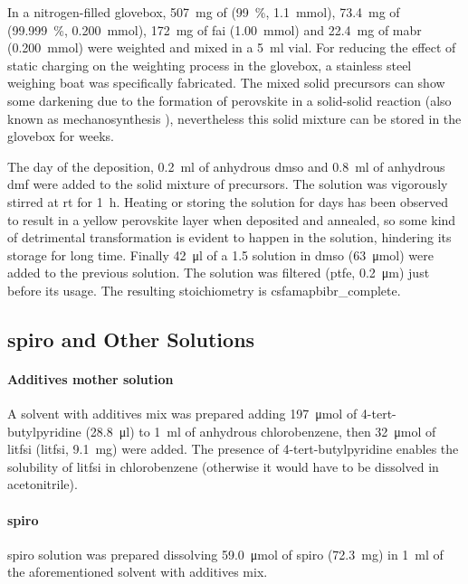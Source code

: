 		In a nitrogen-filled glovebox, \SI{507}{\mg} of  (\SI{99}{\%}, \SI{1.1}{\mmol}), \SI{73.4}{\mg} of  (\SI{99.999}{\%}, \SI{0.200}{\mmol}), \SI{172}{\mg} of \gls{fai} (\SI{1.00}{\mmol}) and \SI{22.4}{\mg} of \gls{mabr} (\SI{0.200}{\mmol}) were weighted and mixed in a \SI{5}{\ml} vial.
		For reducing the effect of static charging on the weighting process in the glovebox, a stainless steel weighing boat was specifically fabricated.
		The mixed solid precursors can show some darkening due to the formation of perovskite in a solid-solid reaction (also known as mechanosynthesis \cite{Prochowicz2018}), nevertheless this solid mixture can be stored in the glovebox for weeks.

		The day of the deposition, \SI{0.2}{\ml} of anhydrous \gls{dmso} and \SI{0.8}{\ml} of anhydrous \gls{dmf} were added to the solid mixture of precursors.
		The solution was vigorously stirred at \gls{rt} for \SI{1}{\hour}.
		Heating or storing the solution for days has been observed to result in a yellow perovskite layer when deposited and annealed, so some kind of detrimental transformation is evident to happen in the solution, hindering its storage for long time.
		Finally \SI{42}{\ul} of	a \SI{1.5}{\Molar}  solution in \gls{dmso} (\SI{63}{\umol}) were added to the previous solution.
		The solution was filtered (\gls{ptfe}, \SI{0.2}{\um}) just before its usage.
		The resulting stoichiometry is \acrshort{csfamapbibr_complete}.

	\subsection{\Gls{spiro} and Other  Solutions}

		\paragraph{Additives mother solution}
		A solvent with additives mix was prepared adding \SI{197}{\umol} of 4-tert-butylpyridine (\SI{28.8}{\ul}) to \SI{1}{\ml} of anhydrous chlorobenzene, then \SI{32}{\umol} of \glsdesc{litfsi} (\gls{litfsi}, \SI{9.1}{\mg}) were added.
		The presence of 4-tert-butylpyridine enables the solubility of \gls{litfsi} in chlorobenzene (otherwise it would have to be dissolved in acetonitrile).

		\paragraph{\Gls{spiro}} 
		\Glsdesc{spiro} solution was prepared dissolving \SI{59.0}{\umol} of \gls{spiro} (\SI{72.3}{\mg}) in \SI{1}{\ml} of the aforementioned solvent with additives mix.

